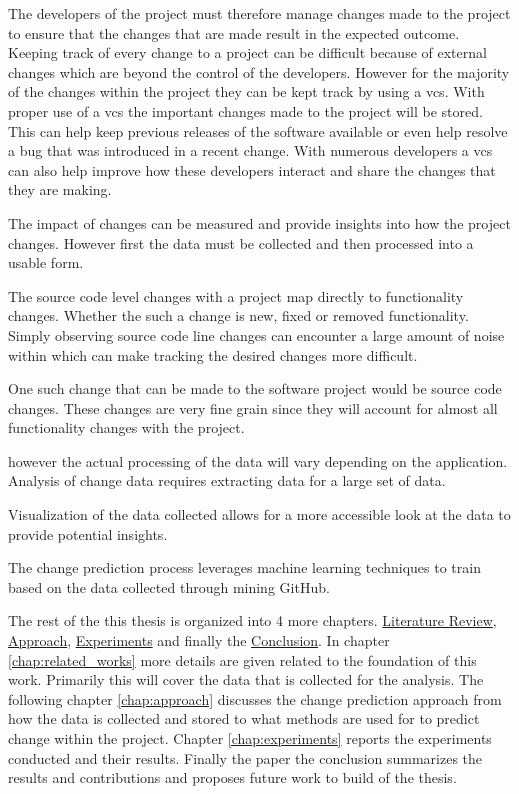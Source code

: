 The developers of the project must therefore manage changes made to the project to ensure that the changes that are made result in the expected outcome. Keeping track of every change to a project can be difficult because of external changes which are beyond the control of the developers. However for the majority of the changes within the project they can be kept track by using a \gls{vcs}. With proper use of a \gls{vcs} the important changes made to the project will be stored. This can help keep previous releases of the software available or even help resolve a bug that was introduced in a recent change. With numerous developers a \gls{vcs} can also help improve how these developers interact and share the changes that they are making.

The impact of changes can be measured and provide insights into how the project changes. However first the data must be collected and then processed into a usable form.

The source code level changes with a project map directly to functionality changes. Whether the such a change is new, fixed or removed functionality. Simply observing source code line changes can encounter a large amount of noise within which can make tracking the desired changes more difficult.

One such change that can be made to the software project would be source code changes. These changes are very fine grain since they will account for almost all functionality changes with the project. 

however the actual processing of the data will vary depending on the application. Analysis of change data requires extracting data for a large set of data.

Visualization of the data collected allows for a more accessible look at the data to provide potential insights.

The change prediction process leverages machine learning techniques to train based on the data collected through mining GitHub.


The rest of the this thesis is organized into 4 more chapters. \hyperref[chap:related_works]{Literature Review}, \hyperref[chap:approach]{Approach}, \hyperref[chap:experiments]{Experiments} and finally the \hyperref[chap:conclusions]{Conclusion}. In chapter \ref{chap:related_works} more details are given related to the foundation of this work. Primarily this will cover the data that is collected for the analysis. The following chapter \ref{chap:approach} discusses the change prediction approach from how the data is collected and stored to what methods are used for to predict change within the project. Chapter \ref{chap:experiments} reports the experiments conducted and their results. Finally the paper the conclusion summarizes the results and contributions and proposes future work to build of the thesis.